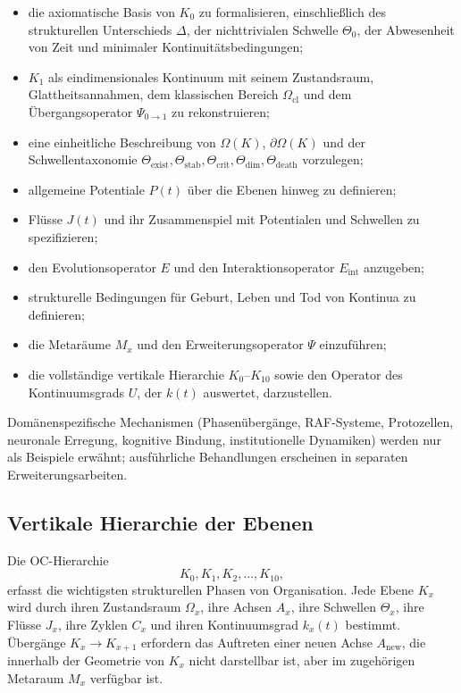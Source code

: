 \begin{itemize}
    \item die axiomatische Basis von \(K_0\) zu formalisieren, einschließlich des strukturellen Unterschieds \(\Delta\), der nichttrivialen Schwelle \(\Theta_0\), der Abwesenheit von Zeit und minimaler Kontinuitätsbedingungen;
    \item \(K_1\) als eindimensionales Kontinuum mit seinem Zustandsraum, Glattheitsannahmen, dem klassischen Bereich \(\Omega_{\mathrm{cl}}\) und dem Übergangsoperator \(\Psi_{0\to 1}\) zu rekonstruieren;
    \item eine einheitliche Beschreibung von \(\Omega(K)\), \(\partial\Omega(K)\) und der Schwellentaxonomie \(\Theta_{\mathrm{exist}}, \Theta_{\mathrm{stab}}, \Theta_{\mathrm{crit}}, \Theta_{\mathrm{dim}}, \Theta_{\mathrm{death}}\) vorzulegen;
    \item allgemeine Potentiale \(P(t)\) über die Ebenen hinweg zu definieren;
    \item Flüsse \(J(t)\) und ihr Zusammenspiel mit Potentialen und Schwellen zu spezifizieren;
    \item den Evolutionsoperator \(E\) und den Interaktionsoperator \(E_{\mathrm{int}}\) anzugeben;
    \item strukturelle Bedingungen für Geburt, Leben und Tod von Kontinua zu definieren;
    \item die Metaräume \(M_x\) und den Erweiterungsoperator \(\Psi\) einzuführen;
    \item die vollständige vertikale Hierarchie \(K_0\)–\(K_{10}\) sowie den Operator des Kontinuumsgrads \(U\), der \(k(t)\) auswertet, darzustellen.
\end{itemize}

Domänenspezifische Mechanismen (Phasenübergänge, RAF-Systeme, Protozellen, neuronale Erregung, kognitive Bindung, institutionelle Dynamiken) werden nur als Beispiele erwähnt; ausführliche Behandlungen erscheinen in separaten Erweiterungsarbeiten.

\subsection{Vertikale Hierarchie der Ebenen}

Die OC-Hierarchie
\[
K_0, K_1, K_2, \dots, K_{10},
\]
erfasst die wichtigsten strukturellen Phasen von Organisation. Jede Ebene \(K_x\) wird durch ihren Zustandsraum \(\Omega_x\), ihre Achsen \(A_x\), ihre Schwellen \(\Theta_x\), ihre Flüsse \(J_x\), ihre Zyklen \(C_x\) und ihren Kontinuumsgrad \(k_x(t)\) bestimmt. Übergänge \(K_x \to K_{x+1}\) erfordern das Auftreten einer neuen Achse \(A_{\mathrm{new}}\), die innerhalb der Geometrie von \(K_x\) nicht darstellbar ist, aber im zugehörigen Metaraum \(M_x\) verfügbar ist.

